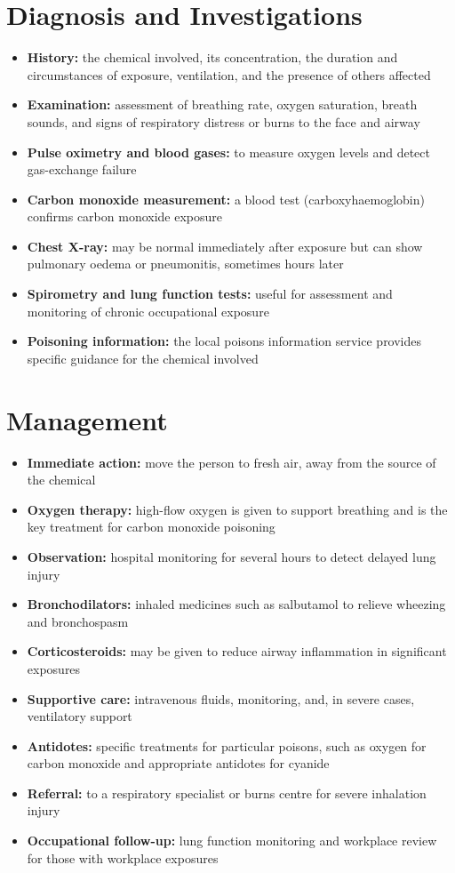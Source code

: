 \section*{Diagnosis and Investigations}
\begin{itemize}
    \item \textbf{History:} the chemical involved, its concentration, the duration and circumstances of exposure, ventilation, and the presence of others affected
    \item \textbf{Examination:} assessment of breathing rate, oxygen saturation, breath sounds, and signs of respiratory distress or burns to the face and airway
    \item \textbf{Pulse oximetry and blood gases:} to measure oxygen levels and detect gas-exchange failure
    \item \textbf{Carbon monoxide measurement:} a blood test (carboxyhaemoglobin) confirms carbon monoxide exposure
    \item \textbf{Chest X-ray:} may be normal immediately after exposure but can show pulmonary oedema or pneumonitis, sometimes hours later
    \item \textbf{Spirometry and lung function tests:} useful for assessment and monitoring of chronic occupational exposure
    \item \textbf{Poisoning information:} the local poisons information service provides specific guidance for the chemical involved
\end{itemize}

\section*{Management}
\begin{itemize}
    \item \textbf{Immediate action:} move the person to fresh air, away from the source of the chemical
    \item \textbf{Oxygen therapy:} high-flow oxygen is given to support breathing and is the key treatment for carbon monoxide poisoning
    \item \textbf{Observation:} hospital monitoring for several hours to detect delayed lung injury
    \item \textbf{Bronchodilators:} inhaled medicines such as salbutamol to relieve wheezing and bronchospasm
    \item \textbf{Corticosteroids:} may be given to reduce airway inflammation in significant exposures
    \item \textbf{Supportive care:} intravenous fluids, monitoring, and, in severe cases, ventilatory support
    \item \textbf{Antidotes:} specific treatments for particular poisons, such as oxygen for carbon monoxide and appropriate antidotes for cyanide
    \item \textbf{Referral:} to a respiratory specialist or burns centre for severe inhalation injury
    \item \textbf{Occupational follow-up:} lung function monitoring and workplace review for those with workplace exposures
\end{itemize}

